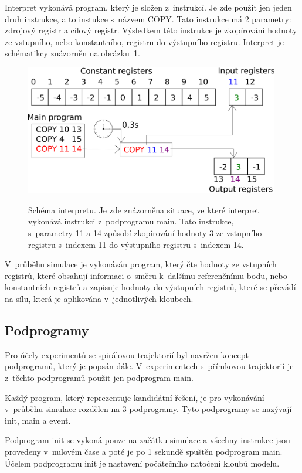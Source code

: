 Interpret vykonává program, který je složen z~instrukcí.
Je zde použit jen jeden druh instrukce, a to instukce s~názvem COPY\@.
Tato instrukce má 2 parametry: zdrojový registr a cílový registr.
Výsledkem této instrukce je zkopírování hodnoty ze vstupního, nebo konstantního, registru do výstupního registru.
Interpret je schématikcy znázorněn na obrázku~\ref{fig:interpret}.

\begin{figure}[h]
    \centering
    {\includegraphics[width=30em]{obrazky/interpret.png}}
    \caption[Schéma interpretu]{
    Schéma interpretu.
    Je zde znázorněna situace, ve které interpret vykonává instrukci z~podprogramu main.
    Tato instrukce, s~parametry 11 a 14 způsobí zkopírování hodnoty 3 ze vstupního registru s~indexem 11 do výstupního registru s~indexem 14.
    }
    \label{fig:interpret}
\end{figure}

V~průběhu simulace je vykonáván program, který čte hodnoty ze vstupních registrů, které obsahují informaci o~směru k~dalšímu referenčnímu bodu, nebo konstantních registrů a zapisuje hodnoty do výstupních registrů, které se převádí na sílu, která je aplikována v~jednotlivých kloubech.

\subsection{Podprogramy}

Pro účely experimentů se spirálovou trajektorií byl navržen koncept podprogramů, který je popsán dále.
V~experimentech s~přímkovou trajektorií je z~těchto podprogramů použit jen podprogram main.

Každý program, který reprezentuje kandidátní řešení, je pro vykonávání v~průběhu simulace rozdělen na 3 podprogramy.
Tyto podprogramy se nazývají init, main a event.

Podprogram init se vykoná pouze na začátku simulace a všechny instrukce jsou provedeny v~nulovém čase a poté je po 1 sekundě spuštěn podprogram main.
Účelem podprogramu init je nastavení počátečního natočení kloubů modelu.

